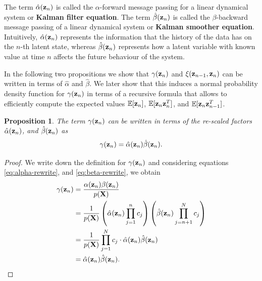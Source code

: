 \documentclass[12pt, oneside]{book}
\numberwithin{equation}{section}
\newcommand{\x}{{\bf x}}
\newcommand{\z}{{\bf z}}
\newtheorem{proposition}{Proposition}[section]
\begin{document}
{%
%

The term $\hat\alpha(\z_n)$ is called the $\alpha$-forward message passing for a linear dynamical system or \textbf{Kalman filter equation}.  The term $\hat\beta(\z_n)$ is called the $\beta$-backward message passing of a linear dynamical system or \textbf{Kalman smoother equation}. Intuitively, $\hat\alpha(\z_n)$ represents the information that the history of the data has on the $n$-th latent state, whereas $\hat\beta(\z_n)$ represents how a latent variable with known value at time $n$ affects the future behaviour of the system.

In the following two propositions we show that $\gamma(\z_n)$ and $\xi(\z_{n-1}, \z_{n})$ can be written in terms of $\hat\alpha$ and $\hat\beta$. We later show that this induces a normal probability density function for $\gamma(\z_n)$ in terms of a recursive formula that allows to efficiently compute the expected values $\mathbb{E}[\z_n]$, $\mathbb{E}[\z_n\z_{n}^{T}]$, and  $\mathbb{E}[\z_n\z_{n-1}^{T}]$.


\begin{proposition}\label{prop:gamma-rewrite-scaled}
	The term $\gamma(\z_n)$ can be written in terms of the re-scaled factors $\hat\alpha(\z_n)$, and $\hat\beta(\z_n)$ as
	\begin{equation}
		\gamma(\z_n) = \hat\alpha(\z_n)\hat\beta(\z_n).
	\end{equation}
\end{proposition}

\begin{proof} We write down the definition for $\gamma(\z_n)$ and considering equations \eqref{eq:alpha-rewrite}, and \eqref{eq:beta-rewrite}, we obtain
	\begin{align}
		\gamma(\z_n) &= \frac{\alpha(\z_n) \beta(\z_n)}{p({\bf X})} \\
		&= \frac{1}{p({\bf X})}\left(\hat\alpha(\z_n) \prod_{j=1}^n c_j\right)\left(\hat\beta(\z_n) \prod_{j={n+1}}^N c_j\right) \\
		&= \frac{1}{p(\bf X)} \prod_{j=1}^N c_j \cdot \hat\alpha(\z_n) \hat\beta(\z_n)\\
		&= \hat\alpha(\z_n) \hat\beta(\z_n).
	\end{align}
\end{proof}

}
\end{document}
